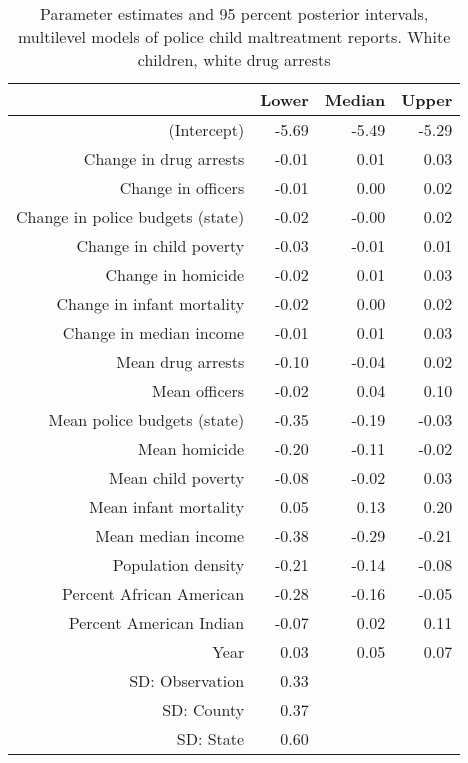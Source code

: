 \begin{table}[ht]
\centering
\begin{tabular}{rrrr}
  \hline
 & Lower & Median & Upper \\ 
  \hline
(Intercept) & -5.69 & -5.49 & -5.29 \\ 
  Change in drug arrests & -0.01 & 0.01 & 0.03 \\ 
  Change in officers & -0.01 & 0.00 & 0.02 \\ 
  Change in police budgets (state) & -0.02 & -0.00 & 0.02 \\ 
  Change in child poverty & -0.03 & -0.01 & 0.01 \\ 
  Change in homicide & -0.02 & 0.01 & 0.03 \\ 
  Change in infant mortality & -0.02 & 0.00 & 0.02 \\ 
  Change in median income & -0.01 & 0.01 & 0.03 \\ 
  Mean drug arrests & -0.10 & -0.04 & 0.02 \\ 
  Mean officers & -0.02 & 0.04 & 0.10 \\ 
  Mean police budgets (state) & -0.35 & -0.19 & -0.03 \\ 
  Mean homicide & -0.20 & -0.11 & -0.02 \\ 
  Mean child poverty & -0.08 & -0.02 & 0.03 \\ 
  Mean infant mortality & 0.05 & 0.13 & 0.20 \\ 
  Mean median income & -0.38 & -0.29 & -0.21 \\ 
  Population density & -0.21 & -0.14 & -0.08 \\ 
  Percent African American & -0.28 & -0.16 & -0.05 \\ 
  Percent American Indian & -0.07 & 0.02 & 0.11 \\ 
  Year & 0.03 & 0.05 & 0.07 \\ 
  SD: Observation & 0.33 &  &  \\ 
  SD: County & 0.37 &  &  \\ 
  SD: State & 0.60 &  &  \\ 
   \hline
\end{tabular}
\caption{Parameter estimates and 95 percent posterior intervals, multilevel models of 
             police child maltreatment reports. White children, white drug arrests} 
\end{table}
